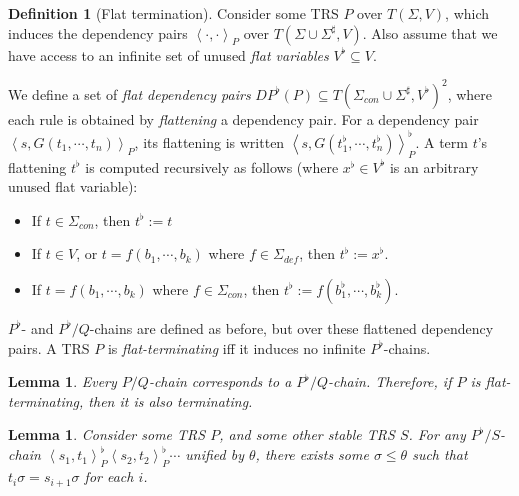 \documentclass{article}
\newtheorem{lemma}[theorem]{Lemma}
\theoremstyle{definition}
\newtheorem{definition}[theorem]{Definition}
\newcommand{\dpair}[2]{\left\langle #1, #2 \right\rangle}
\begin{document}
\begin{definition}[Flat termination]
    Consider some TRS $P$ over $T(\Sigma, V)$, which induces the dependency pairs $\dpair{\cdot}{\cdot}_P$ over $T(\Sigma \cup \Sigma^\sharp, V)$. Also assume that we have access to an infinite set of unused \emph{flat variables} $V^\flat \subseteq V$.
    
    We define a set of \emph{flat dependency pairs} $DP^\flat(P) \subseteq T(\Sigma_{con} \cup \Sigma^\sharp, V^\flat)^2$, where each rule is obtained by \emph{flattening} a dependency pair. For a dependency pair $\dpair{s}{G(t_1 , \cdots, t_n)}_P$, its flattening is written $\dpair{s}{G( t^\flat_1, \cdots, t_n^\flat)}^\flat_P$. A term $t$'s flattening $t^\flat$ is computed recursively as follows (where $x^\flat \in V^\flat$ is an arbitrary unused flat variable):
    \begin{itemize}
        \item If $t \in \Sigma_{con}$, then $t^\flat := t$
        \item If $t \in V$, or $t = f (b_1, \cdots, b_k)$ where $f \in \Sigma_{def}$, then $t^\flat := x^\flat$.
        \item If $t = f( b_1, \cdots, b_k)$ where $f \in \Sigma_{con}$, then $t^\flat := f( b^\flat_1, \cdots, b^\flat_k)$.
    \end{itemize} 
    $P^\flat$- and $P^\flat/Q$-chains are defined as before, but over these flattened dependency pairs. A TRS $P$ is \emph{flat-terminating} iff it induces no infinite $P^\flat$-chains. 
\end{definition}

\begin{lemma} \label{thm:flat_termination_overapprox}
    Every $P/Q$-chain corresponds to a $P^\flat/Q$-chain. Therefore, if $P$ is flat-terminating, then it is also terminating.
\end{lemma}

\begin{lemma} 
    Consider some TRS $P$, and some other stable TRS $S$. For any $P^\flat/S$-chain $\dpair{s_1}{t_1}^\flat_P \dpair{s_2}{t_2}^\flat_P \cdots$ unified by $\theta$, there exists some $\sigma \leq \theta$ such that $t_i \sigma = s_{i+1} \sigma$ for each $i$. 
\end{lemma}
\end{document}
